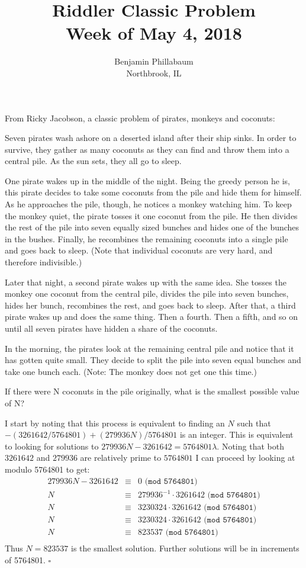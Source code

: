 \documentclass[11pt]{article}
\title{Riddler Classic Problem\\Week of May 4, 2018}
\author{Benjamin Phillabaum\\Northbrook, IL}
\begin{document}
\maketitle
\newpage

\begin{framed}
From Ricky Jacobson, a classic problem of pirates, monkeys and coconuts:

Seven pirates wash ashore on a deserted island after their ship sinks. In order to survive, they gather as many coconuts as they can find and throw them into a central pile. As the sun sets, they all go to sleep.

One pirate wakes up in the middle of the night. Being the greedy person he is, this pirate decides to take some coconuts from the pile and hide them for himself. As he approaches the pile, though, he notices a monkey watching him. To keep the monkey quiet, the pirate tosses it one coconut from the pile. He then divides the rest of the pile into seven equally sized bunches and hides one of the bunches in the bushes. Finally, he recombines the remaining coconuts into a single pile and goes back to sleep. (Note that individual coconuts are very hard, and therefore indivisible.)

Later that night, a second pirate wakes up with the same idea. She tosses the monkey one coconut from the central pile, divides the pile into seven bunches, hides her bunch, recombines the rest, and goes back to sleep. After that, a third pirate wakes up and does the same thing. Then a fourth. Then a fifth, and so on until all seven pirates have hidden a share of the coconuts.

In the morning, the pirates look at the remaining central pile and notice that it has gotten quite small. They decide to split the pile into seven equal bunches and take one bunch each. (Note: The monkey does not get one this time.)

If there were N coconuts in the pile originally, what is the smallest possible value of N?

\end{framed}
I start by noting that this process is equivalent to finding an $N$ such that $-(3261642/5764801) + (279936 N)/5764801$ is an integer. This is equivalent to looking for solutions to $279936 N - 3261642 = 5764801 \lambda$. Noting that both $3261642$ and $279936$ are relatively prime to $5764801$ I can proceed by looking at modulo 5764801 to get:
\begin{eqnarray}
279936 N - 3261642 &\equiv& 0 \texttt{ (mod 5764801)}\\
N &\equiv&  279936^{-1} \cdot 3261642  \texttt{ (mod 5764801)}\\
N &\equiv&  3230324 \cdot 3261642  \texttt{ (mod 5764801)}\\
N &\equiv&  3230324 \cdot 3261642  \texttt{ (mod 5764801)}\\
N &\equiv&  823537  \texttt{ (mod 5764801)}\\
\end{eqnarray}
Thus $N=823537$ is the smallest solution. Further solutions will be in increments of 5764801.
$\square$
\end{document}
